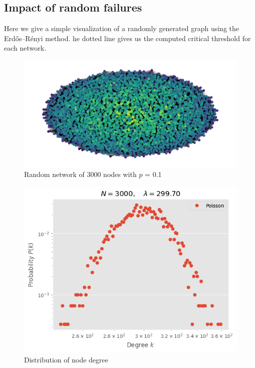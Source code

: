 \documentclass[
]{article}
\begin{document}
\hypertarget{impact-of-random-failures}{%
\subsection{Impact of random failures}\label{impact-of-random-failures}}

Here we give a simple visualization of a randomly generated graph using
the Erdős--Rényi method. he dotted line gives us the computed critical
threshold for each network.

\begin{figure}
\centering
\includegraphics{./assets/3000_draw.png}
\caption{Random network of 3000 nodes with \(p\) = 0.1}
\end{figure}

\begin{figure}
\centering
\includegraphics{./assets/3000_poisson.png}
\caption{Distribution of node degree}
\end{figure}
\end{document}
